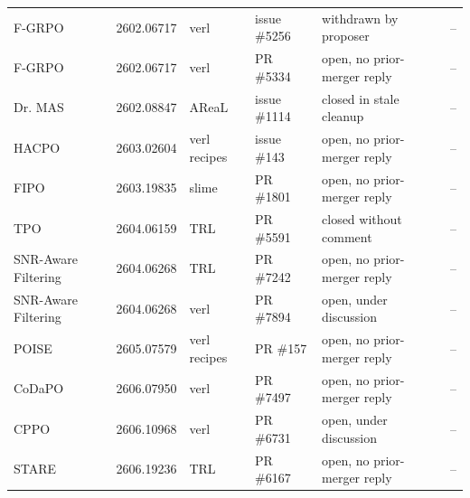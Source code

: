 \begin{longtable}{@{}>{\raggedright\arraybackslash}p{2.2cm} l l l >{\raggedright\arraybackslash}p{2.5cm} >{\raggedright\arraybackslash}p{2.6cm}@{}}
F-GRPO & 2602.06717 & verl & issue \#5256 & withdrawn by proposer & -- \\
F-GRPO & 2602.06717 & verl & PR \#5334 & open, no prior-merger reply & -- \\
Dr. MAS & 2602.08847 & AReaL & issue \#1114 & closed in stale cleanup & -- \\
HACPO & 2603.02604 & verl recipes & issue \#143 & open, no prior-merger reply & -- \\
FIPO & 2603.19835 & slime & PR \#1801 & open, no prior-merger reply & -- \\
TPO & 2604.06159 & TRL & PR \#5591 & closed without comment & -- \\
SNR-Aware Filtering & 2604.06268 & TRL & PR \#7242 & open, no prior-merger reply & -- \\
SNR-Aware Filtering & 2604.06268 & verl & PR \#7894 & open, under discussion & -- \\
POISE & 2605.07579 & verl recipes & PR \#157 & open, no prior-merger reply & -- \\
CoDaPO & 2606.07950 & verl & PR \#7497 & open, no prior-merger reply & -- \\
CPPO & 2606.10968 & verl & PR \#6731 & open, under discussion & -- \\
STARE & 2606.19236 & TRL & PR \#6167 & open, no prior-merger reply & -- \\
\bottomrule
\end{longtable}
